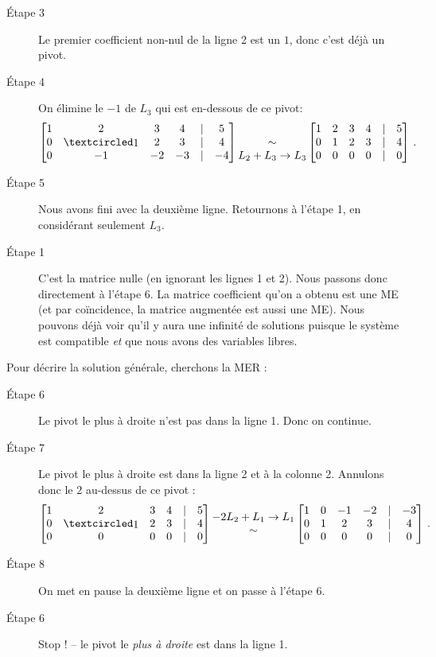 \begin{myexample}
\begin{description}
\item[Étape 3]  Le premier coefficient non-nul de la ligne 2 est un $1$, donc c'est d\'ej\`a un pivot.

\item[Étape 4]  On \'elimine le $-1$ de $L_3$ qui est en-dessous de ce pivot:
$$\mat{
1 & 2 & 3 & 4 &|& 5\\
0 & \pivot & 2 & 3 &|& 4\\
0 & -1 & -2 & -3 & |& -4}
\mt{\\ \sim \\ L_2+L_3\to L_3}
\mat{
1 & 2 & 3 & 4 &|& 5\\
0 & 1 & 2 & 3 &|& 4\\
0 & 0 & 0 & 0 & |& 0}\,.
$$
\item[Étape 5] Nous avons fini avec la deuxième ligne.  Retournons à l'étape 1, en considérant seulement $L_3$.

\item[Étape 1] C'est la matrice nulle (en ignorant les lignes 1 et 2). Nous passons donc directement à l'étape 6. La matrice coefficient qu'on a obtenu est une ME (et par coïncidence, la matrice augmentée est aussi une ME).
Nous pouvons déjà voir qu'il y aura une infinité de solutions puisque le système
est compatible {\it et} que nous avons des variables libres.
\end{description}
Pour décrire la solution générale, cherchons la MER :
\begin{description}
\item[Étape 6] Le pivot le plus \`a droite n'est pas dans la ligne 1. Donc on continue.

\item[Étape 7] Le pivot le plus à droite est dans la ligne 2 et à la colonne 2.  Annulons donc le $2$ au-dessus de ce pivot :
$$\mat{
1 & 2 & 3 & 4 &|& 5\\
0 & \pivot & 2 & 3 &|& 4\\
0 & 0 & 0 & 0 & |& 0}
\mt{-2L_2+L_1\to L_1\\ \sim \\ }
\mat{
1 & 0 & -1 & -2 &|& -3\\
0 & 1 & 2 & 3 &|& 4\\
0 & 0 & 0 & 0 & |& 0}\,.
$$

\item[Étape 8] On met en pause la deuxième ligne et on passe à l'étape 6.

\item[Étape 6] Stop ! -- le pivot le {\it plus  à droite} est dans la ligne 1.


\end{description}
\end{myexample}
